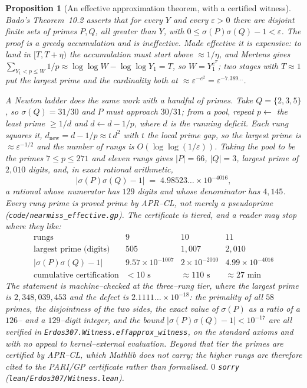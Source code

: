 \documentclass[11pt]{article}
\newtheorem{proposition}[theorem]{Proposition}
\theoremstyle{definition}
\begin{document}
\begin{proposition}[An effective approximation theorem, with a certified witness]\label{prop:effapprox}
Bado's Theorem~10.2 \cite{Bado2026} asserts that for every $Y$ and every $\varepsilon>0$ there are
disjoint finite sets of primes $P,Q$, all greater than $Y$, with $0\le\sigma(P)\sigma(Q)-1<
\varepsilon$. The proof is a greedy accumulation and is ineffective. Made effective it is expensive:
to land in $[T,T+\eta)$ the accumulation must start above $\approx1/\eta$, and Mertens gives
$\sum_{Y_1<p\le W}1/p\approx\log\log W-\log\log Y_1=T$, so $W=Y_1^{e^{T}}$; two stages with
$T\approx1$ put the largest prime and the cardinality both at $\approx\varepsilon^{-e^{2}}=
\varepsilon^{-7.389\ldots}$.

A Newton ladder does the same work with a handful of primes. Take $Q=\{2,3,5\}$, so
$\sigma(Q)=31/30$ and $P$ must approach $30/31$; from a pool, repeat $p\leftarrow$ the least prime
$\ge1/d$ and $d\leftarrow d-1/p$, where $d$ is the running deficit. Each rung squares it,
$d_{\mathrm{new}}=d-1/p\approx t\,d^{2}$ with $t$ the local prime gap, so the largest prime is
$\approx\varepsilon^{-1/2}$ and the number of rungs is $O(\log\log(1/\varepsilon))$. Taking the pool
to be the primes $7\le p\le271$ and eleven rungs gives $|P|=66$, $|Q|=3$, largest prime of $2{,}010$
digits, and, in exact rational arithmetic,
\[ \bigl|\sigma(P)\sigma(Q)-1\bigr|\;=\;4.98523\ldots\times10^{-4016}, \]
a rational whose numerator has $129$ digits and whose denominator has $4{,}145$. Every rung prime is
\emph{proved} prime by \textup{APR--CL}, not merely a pseudoprime
\textup{(\texttt{code/nearmiss\_effective.gp})}. The certificate is tiered, and a reader may stop
where they like:
\[
\begin{array}{l|ccc}
\text{rungs} & 9 & 10 & 11\\\hline
\text{largest prime (digits)} & 505 & 1{,}007 & 2{,}010\\
\bigl|\sigma(P)\sigma(Q)-1\bigr| & 9.57\times10^{-1007} & 2\times10^{-2010} &
  4.99\times10^{-4016}\\
\text{cumulative certification} & <10\text{ s} & \approx110\text{ s} & \approx27\text{ min}
\end{array}
\]
The statement is machine--checked at the three--rung tier, where the largest prime is
$2{,}348{,}039{,}453$ and the defect is $2.1111\ldots\times10^{-18}$: the primality of all $58$
primes, the disjointness of the two sides, the exact value of $\sigma(P)$ as a ratio of a $126$--
and a $129$--digit integer, and the bound $|\sigma(P)\sigma(Q)-1|<10^{-17}$ are all verified in
\texttt{Erdos307.Witness.effapprox\_witness}, on the standard axioms and with no appeal to
kernel--external evaluation. Beyond that tier the primes are certified by APR--CL, which Mathlib
does not carry; the higher rungs are therefore cited to the \textup{PARI/GP} certificate rather
than formalised. $0$ \texttt{sorry} \textup{(\texttt{lean/Erdos307/Witness.lean})}.
\end{proposition}
\end{document}
